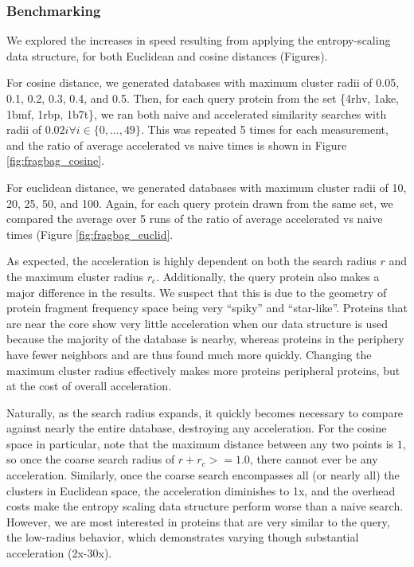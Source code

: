 \documentclass[review,preprint,12pt]{elsarticle}
\theoremstyle{definition}
\theoremstyle{remark}
\numberwithin{equation}{section}
\begin{document}
\subsubsection*{Benchmarking}
We explored the increases in speed resulting from applying the entropy-scaling data structure, for both Euclidean and cosine distances (Figures).

For cosine distance, we generated databases with maximum cluster radii of 0.05, 0.1, 0.2, 0.3, 0.4, and 0.5.
Then, for each query protein from the set \{4rhv, 1ake, 1bmf, 1rbp, 1b7t\}, we ran both naive and accelerated similarity searches with radii of $0.02i \forall i \in \{0,\ldots,49\}$.
This was repeated 5 times for each measurement, and the ratio of average accelerated vs naive times is shown in Figure \ref{fig:fragbag_cosine}.

For euclidean distance, we generated databases with maximum cluster radii of 10, 20, 25, 50, and 100.
Again, for each query protein drawn from the same set, we compared the average over 5 runs of the ratio of average accelerated vs naive times (Figure \ref{fig:fragbag_euclid}.

As expected, the acceleration is highly dependent on both the search radius $r$ and the maximum cluster radius $r_c$.
Additionally, the query protein also makes a major difference in the results.
We suspect that this is due to the geometry of protein fragment frequency space being very ``spiky'' and ``star-like''.
Proteins that are near the core show very little acceleration when our data structure is used because the majority of the database is nearby, whereas proteins in the periphery have fewer neighbors and are thus found much more quickly.
Changing the maximum cluster radius effectively makes more proteins peripheral proteins, but at the cost of overall acceleration.

Naturally, as the search radius expands, it quickly becomes necessary to compare against nearly the entire database, destroying any acceleration.
For the cosine space in particular, note that the maximum distance between any two points is $1$, so once the coarse search radius of $r+r_c >= 1.0$, there cannot ever be any acceleration.
Similarly, once the coarse search encompasses all (or nearly all) the clusters in Euclidean space, the acceleration diminishes to 1x, and the overhead costs make the entropy scaling data structure perform worse than a naive search.
However, we are most interested in proteins that are very similar to the query, the low-radius behavior, which demonstrates varying though substantial acceleration (2x-30x).
\end{document}
